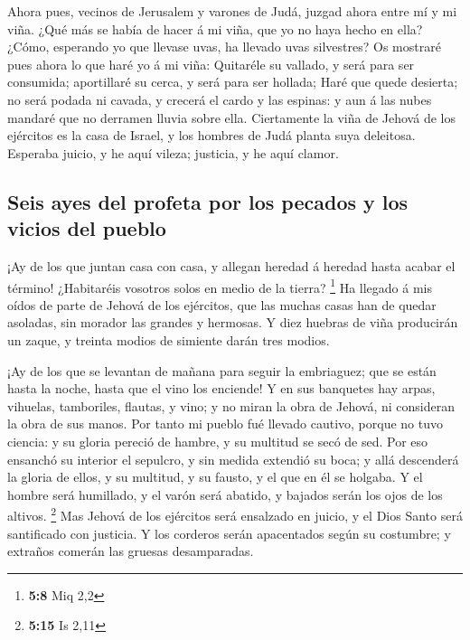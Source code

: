  Ahora pues, vecinos de Jerusalem y varones de Judá, juzgad
ahora entre mí y mi viña.  ¿Qué más se había de hacer á mi
viña, que yo no haya hecho en ella? ¿Cómo, esperando yo que llevase
uvas, ha llevado uvas silvestres?  Os mostraré pues ahora lo
que haré yo á mi viña: Quitaréle su vallado, y será para ser consumida;
aportillaré su cerca, y será para ser hollada;  Haré que
quede desierta; no será podada ni cavada, y crecerá el cardo y las
espinas: y aun á las nubes mandaré que no derramen lluvia sobre ella.
 Ciertamente la viña de Jehová de los ejércitos es la casa
de Israel, y los hombres de Judá planta suya deleitosa. Esperaba juicio,
y he aquí vileza; justicia, y he aquí clamor.

\hypertarget{seis-ayes-del-profeta-por-los-pecados-y-los-vicios-del-pueblo}{%
\subsection{Seis ayes del profeta por los pecados y los vicios del
pueblo}\label{seis-ayes-del-profeta-por-los-pecados-y-los-vicios-del-pueblo}}

 ¡Ay de los que juntan casa con casa, y allegan heredad á
heredad hasta acabar el término! ¿Habitaréis vosotros solos en medio de
la tierra? \footnote{\textbf{5:8} Miq 2,2}  Ha llegado á mis
oídos de parte de Jehová de los ejércitos, que las muchas casas han de
quedar asoladas, sin morador las grandes y hermosas.  Y
diez huebras de viña producirán un zaque, y treinta modios de simiente
darán tres modios.

 ¡Ay de los que se levantan de mañana para seguir la
embriaguez; que se están hasta la noche, hasta que el vino los enciende!
 Y en sus banquetes hay arpas, vihuelas, tamboriles,
flautas, y vino; y no miran la obra de Jehová, ni consideran la obra de
sus manos.  Por tanto mi pueblo fué llevado cautivo, porque
no tuvo ciencia: y su gloria pereció de hambre, y su multitud se secó de
sed.  Por eso ensanchó su interior el sepulcro, y sin
medida extendió su boca; y allá descenderá la gloria de ellos, y su
multitud, y su fausto, y el que en él se holgaba.  Y el
hombre será humillado, y el varón será abatido, y bajados serán los ojos
de los altivos. \footnote{\textbf{5:15} Is 2,11}  Mas
Jehová de los ejércitos será ensalzado en juicio, y el Dios Santo será
santificado con justicia.  Y los corderos serán apacentados
según su costumbre; y extraños comerán las gruesas desamparadas.

